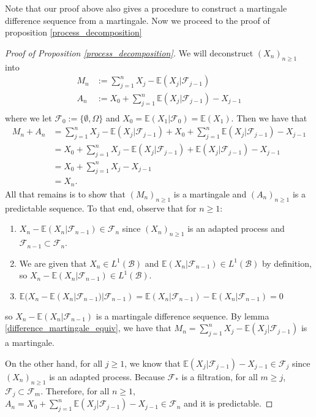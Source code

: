 Note that our proof above also gives a procedure to construct a martingale difference sequence from a martingale. Now we proceed to the proof of proposition \ref{process_decomposition}
\begin{proof}[Proof of Proposition \ref{process_decomposition}]
    We will deconstruct \((X_{n})_{n \geq 1}\) into
    \begin{align*}
        M_{n} &:= \sum\limits_{j=1}^{n} X_{j} - \mathbb{E}(X_{j}|\mathcal{F}_{j-1}) \\
        A_{n} &:=  X_{0} + \sum\limits_{j=1}^{n} \mathbb{E}(X_{j}|\mathcal{F}_{j-1}) - X_{j-1} \\
    \end{align*}
    where we let \(\mathcal{F}_{0} := \{\emptyset, \Omega\}\) and \(X_{0} = \mathbb{E}(X_{1}|\mathcal{F}_{0}) = \mathbb{E}(X_{1})\). Then we have that
    \begin{align*}
        M_{n} + A_{n} &= \sum\limits_{j=1}^{n} X_{j} - \mathbb{E}(X_{j}|\mathcal{F}_{j-1}) + X_{0} + \sum\limits_{j=1}^{n} \mathbb{E}(X_{j}|\mathcal{F}_{j-1}) - X_{j-1} \\
        &=  X_{0} + \sum\limits_{j=1}^{n} X_{j} - \mathbb{E}(X_{j}|\mathcal{F}_{j-1}) + \mathbb{E}(X_{j}|\mathcal{F}_{j-1}) - X_{j-1} \\
        &= X_{0} + \sum\limits_{j=1}^{n} X_{j} - X_{j-1} \\
        &= X_{n}.
    \end{align*}
    All that remains is to show that \((M_{n})_{n \geq 1}\) is a martingale and \((A_{n})_{n \geq 1}\) is a predictable sequence. To that end, observe that for \(n \geq 1\):
    \begin{enumerate}
        \item \(X_{n} - \mathbb{E}(X_{n}|\mathcal{F}_{n-1}) \in \mathcal{F}_{n}\) since \((X_{n})_{n \geq 1}\) is an adapted process and \(\mathcal{F}_{n-1} \subset \mathcal{F}_{n}\).
        \item We are given that \(X_{n} \in L^{1}(\mathcal{B})\) and \(\mathbb{E}(X_{n}|\mathcal{F}_{n-1})\in L^{1}(\mathcal{B})\) by definition, so \(X_{n} - \mathbb{E}(X_{n}|\mathcal{F}_{n-1}) \in L^{1}(\mathcal{B})\).
        \item \(\mathbb{E}(X_{n} - \mathbb{E}(X_{n}|\mathcal{F}_{n-1})|\mathcal{F}_{n-1})= \mathbb{E}(X_{n}|\mathcal{F}_{n-1}) - \mathbb{E}(X_{n}|\mathcal{F}_{n-1}) = 0\)
    \end{enumerate}
    so \(X_{n} - \mathbb{E}(X_{n}|\mathcal{F}_{n-1})\) is a martingale difference sequence. By lemma \ref{difference_martingale_equiv}, we have that \( M_{n} = \sum\limits_{j=1}^{n} X_{j} - \mathbb{E}(X_{j}|\mathcal{F}_{j-1})\) is a martingale.

    On the other hand, for all \(j \geq 1\), we know that \(\mathbb{E}(X_{j}|\mathcal{F}_{j-1}) - X_{j-1} \in \mathcal{F}_{j}\) since \((X_{n})_{n \geq 1}\) is an adapted process. Because \(\mathcal{F}_{*}\) is a filtration, for all \(m \geq j\), \(\mathcal{F}_{j} \subset \mathcal{F}_{m}\). Therefore, for all \(n \geq 1\), \(A_{n} =  X_{0} + \sum\limits_{j=1}^{n} \mathbb{E}(X_{j}|\mathcal{F}_{j-1}) - X_{j-1} \in \mathcal{F}_{n}\) and it is predictable.
\end{proof}

